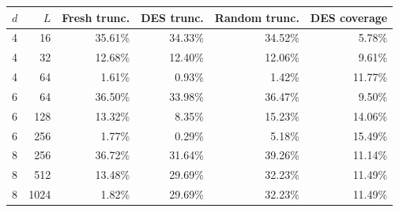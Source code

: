 \begin{tabular}{lrrrrr}
\toprule
$d$ & $L$ & Fresh trunc. & DES trunc. & Random trunc. & DES coverage \\
\midrule
4 & 16 & 35.61\% & 34.33\% & 34.52\% & 5.78\% \\
4 & 32 & 12.68\% & 12.40\% & 12.06\% & 9.61\% \\
4 & 64 & 1.61\% & 0.93\% & 1.42\% & 11.77\% \\
6 & 64 & 36.50\% & 33.98\% & 36.47\% & 9.50\% \\
6 & 128 & 13.32\% & 8.35\% & 15.23\% & 14.06\% \\
6 & 256 & 1.77\% & 0.29\% & 5.18\% & 15.49\% \\
8 & 256 & 36.72\% & 31.64\% & 39.26\% & 11.14\% \\
8 & 512 & 13.48\% & 29.69\% & 32.23\% & 11.49\% \\
8 & 1024 & 1.82\% & 29.69\% & 32.23\% & 11.49\% \\
\bottomrule
\end{tabular}
